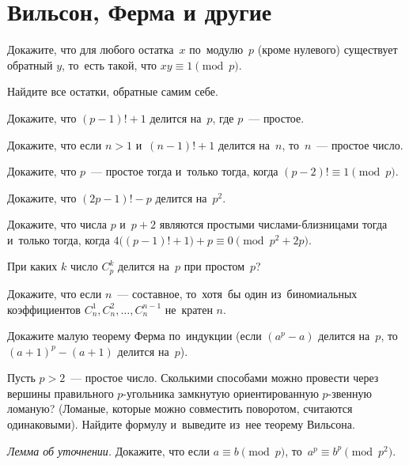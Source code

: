 
\section*{Вильсон, Ферма и другие}


\begin{problems}

\item
Докажите, что для любого остатка~$x$ по~модулю~$p$ (кроме нулевого) существует
обратный $y$, то~есть такой, что $x y \equiv 1 \pmod{p}$.

\item
Найдите все остатки, обратные самим себе.

\item{}
Докажите, что $(p - 1)! + 1$ делится на~$p$, где $p$~--- простое.

\item
Докажите, что если $n > 1$ и~$(n - 1)! + 1$ делится на~$n$, то~$n$~--- простое
число.

\item
Докажите, что $p$~--- простое тогда и~только тогда, когда
$(p - 2)! \equiv 1 \pmod{p}$.

\item
Докажите, что $(2 p - 1)! - p$ делится на~$p^2$.

\item
Докажите, что числа $p$ и~$p + 2$ являются простыми числами-близницами
тогда и~только тогда, когда
\(
    4 \bigl( (p - 1)! + 1 \bigr) + p \equiv 0 \pmod{p^2 + 2 p}
\).

\item
При каких $k$ число $C_{p}^{k}$ делится на~$p$ при простом~$p$?

\item
Докажите, что если $n$~--- составное, то~хотя~бы один из~биномиальных
коэффициентов $C_{n}^{1}, C_{n}^{2}, \ldots, C_{n}^{n-1}$ не~кратен $n$.

\item
Докажите малую теорему Ферма по~индукции (если $(a^p - a)$ делится на~$p$,
то~$(a + 1)^p - (a + 1)$ делится на~$p$).

\item
Пусть $p > 2$~--- простое число.
Сколькими способами можно провести через вершины правильного $p$-угольника
замкнутую ориентированную $p$-звенную ломаную?
(Ломаные, которые можно совместить поворотом, считаются одинаковыми).
Найдите формулу и~выведите из~нее теорему Вильсона.

\item
\textit{Лемма об уточнении.}
Докажите, что если $a \equiv b \pmod{p}$, то~$a^p \equiv b^p \pmod{p^2}$.

\end{problems}

